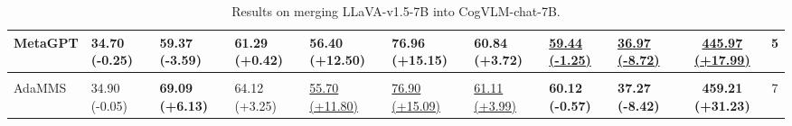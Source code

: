 \begin{table*}[!ht]
{\begin{tabular}{lllllllllcc}
        
        MetaGPT & 34.70  \footnotesize(-0.25) & 59.37  \footnotesize(-3.59) & 61.29  \footnotesize(+0.42) & \textbf{56.40  \footnotesize(+12.50)} & \textbf{76.96  \footnotesize(+15.15)} & 60.84  \footnotesize(+3.72) & \underline{59.44  \footnotesize(-1.25)} & \underline{36.97  \footnotesize(-8.72)} & \underline{445.97 
 \footnotesize(+17.99)} & 5  \\[0.5ex] 
        
\hline 
\rowcolor{gray!20}
\multicolumn{11}{c}{\textbf{Our Method}} \\
\hline 
      
        AdaMMS & 34.90  \footnotesize(-0.05) & \textbf{69.09  \footnotesize(+6.13)} & 64.12  \footnotesize(+3.25) & \underline{55.70  \footnotesize(+11.80)} & \underline{76.90  \footnotesize(+15.09)} & \underline{61.11  \footnotesize(+3.99)} & \textbf{60.12  \footnotesize(-0.57)} & \textbf{37.27  \footnotesize(-8.42) }& \textbf{459.21  \footnotesize(+31.23)} & 7  \\ 
        
        \bottomrule
    \end{tabular}%
        }
    \caption{Results on merging LLaVA-v1.5-7B into CogVLM-chat-7B.}
     \label{tab:cogvlm}

\end{table*}